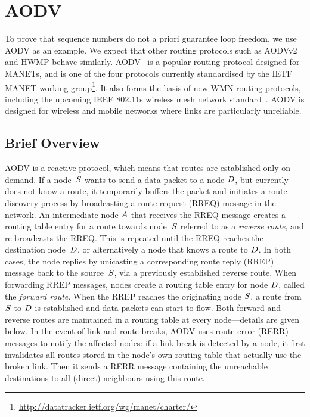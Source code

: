 \documentclass[letterpaper]{sig-alternate-pages}
\newcommand{\gennode}[1]{\ensuremath{\MakeUppercase{#1}}\xspace}
\newcommand{\na}{\gennode{a}}
\newcommand{\nd}{\gennode{d}}
\newcommand{\ns}{\gennode{s}}
\newcommand{\rte}{routing table entry\xspace}
\begin{document}
\section{AODV}\label{sec:aodv}
To prove that sequence numbers do not a priori guarantee loop freedom, 
we use AODV as an example. We expect that other routing protocols such
as AODVv2 and HWMP behave similarly.
AODV~\cite{rfc3561} is a popular routing protocol designed for
MANETs, and is one of the four protocols currently standardised by the
IETF MANET working group\footnote{\url{http://datatracker.ietf.org/wg/manet/charter/}}.
It also forms the basis of new WMN routing protocols, including the
upcoming IEEE 802.11s wireless mesh network standard~\cite{HWMP}.
AODV is designed for wireless and mobile networks where links are particularly 
unreliable.

\subsection{Brief Overview}\label{ssec:aodv}

AODV is a reactive protocol, which means that routes are established only
on demand.  If a node~\ns wants to send a data packet to  a node \nd, but
currently does not know a route, it temporarily buffers the
packet and initiates a route discovery process
by broadcasting a route request (RREQ) message in the network. An intermediate
node \na that receives the RREQ message creates a \rte for a route
towards node~\ns referred to as a \emph{reverse route}, and re-broadcasts the RREQ. This is repeated until the RREQ reaches the destination node~\nd, or alternatively a node that knows a route to \nd. In both cases, the node replies by unicasting a corresponding route reply (RREP) message back to the source~\ns,
via a previously established reverse route. When forwarding RREP messages, nodes
create a \rte for node \nd, called the \emph{forward route}. When the RREP reaches
the originating node \ns, a route from \ns to \nd  is established and data packets
can start to flow. Both forward and reverse routes are maintained in a routing table at every node---details are given below.
In the event of link and route breaks, AODV uses route error (RERR) messages to
notify the affected nodes: if a link break is detected by a node, it first invalidates all routes stored in the node's own routing table that actually use the broken link. Then it sends a RERR message containing the unreachable destinations to all (direct) neighbours using this route. 
\end{document}
